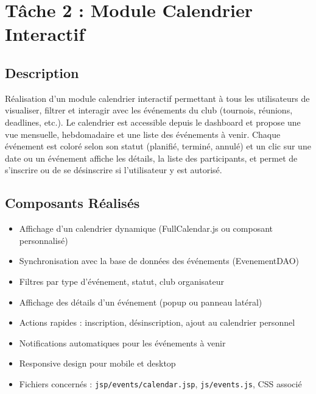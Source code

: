 \documentclass[12pt,a4paper]{article}
\begin{document}

\section{Tâche 2 : Module Calendrier Interactif}

\subsection{Description}
Réalisation d'un module calendrier interactif permettant à tous les utilisateurs de visualiser, filtrer et interagir avec les événements du club (tournois, réunions, deadlines, etc.). Le calendrier est accessible depuis le dashboard et propose une vue mensuelle, hebdomadaire et une liste des événements à venir. Chaque événement est coloré selon son statut (planifié, terminé, annulé) et un clic sur une date ou un événement affiche les détails, la liste des participants, et permet de s'inscrire ou de se désinscrire si l'utilisateur y est autorisé.

\subsection{Composants Réalisés}
\begin{itemize}
    \item Affichage d'un calendrier dynamique (FullCalendar.js ou composant personnalisé)
    \item Synchronisation avec la base de données des événements (EvenementDAO)
    \item Filtres par type d'événement, statut, club organisateur
    \item Affichage des détails d'un événement (popup ou panneau latéral)
    \item Actions rapides : inscription, désinscription, ajout au calendrier personnel
    \item Notifications automatiques pour les événements à venir
    \item Responsive design pour mobile et desktop
    \item Fichiers concernés : \texttt{jsp/events/calendar.jsp}, \texttt{js/events.js}, CSS associé
\end{itemize}
\end{document}
